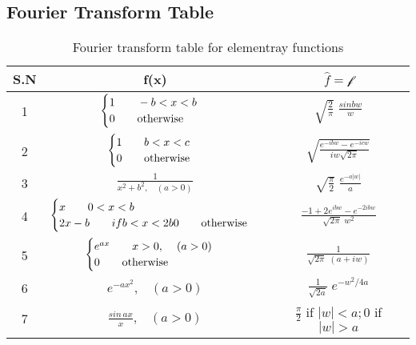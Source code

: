 \documentclass[aima331_lecturenotes_ku.tex]{subfiles}
\begin{document}
 \subsection{Fourier Transform Table}
 \begin{table}[h]
   \centering
   \begin{tabular}{|c|c|c|}
     \hline
     S.N&f(x)&$\hat{f}=\mathcal{f}$ \\
     \hline
     1& $
        \begin{cases}
          1 \hspace{7mm} -b < x <b \\
          0 \hspace{7mm} \text{otherwise}
        \end{cases}
        $ & $\displaystyle \sqrt{\frac{2}{\pi}} \; \frac{sinbw}{w}$ \\[11mm]
     2& $
        \begin{cases}
          1 \hspace{7mm} b < x <c \\
          0 \hspace{7mm} \text{otherwise}
        \end{cases}
        $ & $\displaystyle \sqrt{\frac{e^{-ibw}-e^{-icw}}{iw\sqrt{2 \pi}}}$ \\[11mm]
     3& $\displaystyle \frac{1}{x^2 + b^2, \;\;\; (a>0)} $ & $\displaystyle \sqrt{\frac{\pi}{2}} \; \frac{e^{-a|w|}}{a}$ \\[11mm]
     4& $
        \begin{cases}
          x \hspace{7mm} 0 < x <b \\
          2x-b \hspace{7mm} if b <x<2b
          0 \hspace{7mm} \text{otherwise}
        \end{cases}
        $ & $\displaystyle \frac{-1 + 2e^{ibw} - e^{-2ibw}}{\sqrt{2\pi}\;w^2}$ \\[11mm]
            5& $
        \begin{cases}
          e^{ax} \hspace{7mm}  x >0, \hspace{4mm} (a > 0)\\
          0 \hspace{7mm} \text{otherwise}
        \end{cases}
               $ & $\displaystyle \frac{1 }{\sqrt{2\pi}\;(a+iw)}$\\[11mm]
     6 & $e^{-ax^{2}}, \;\;\; (a>0)$& $\displaystyle \frac{1}{\sqrt{2a}} \; e^{-w^2/4a}$ \\[11mm]
     7 & $\displaystyle \frac{sin\,ax}{x}, \;\;\; (a>0)$ & $\displaystyle \frac{\pi}{2}$ if $|w|<a; 0$ if $|w|>a$ \\[5mm]
     \hline
   \end{tabular}

   \caption{Fourier transform table for elementray functions}
 \end{table}
\end{document}
